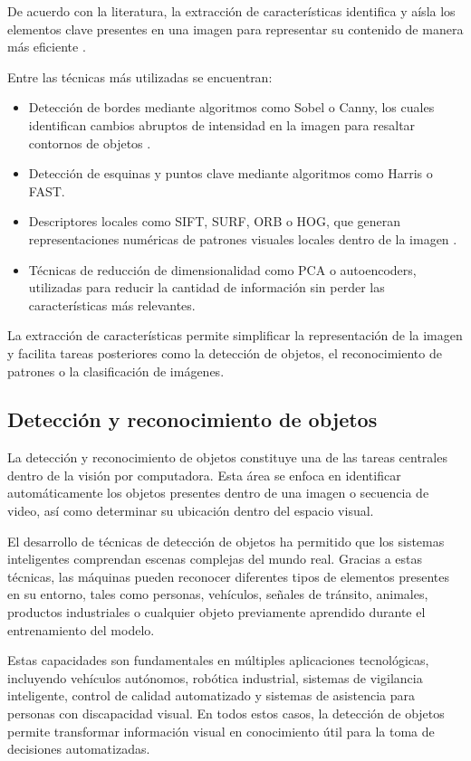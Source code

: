 De acuerdo con la literatura, la extracción de características identifica y aísla los elementos clave presentes en una imagen para representar su contenido de manera más eficiente \cite{unitxlabs_feature_extraction}.

Entre las técnicas más utilizadas se encuentran:
\begin{itemize}
    \item Detección de bordes mediante algoritmos como Sobel o Canny, los cuales identifican cambios abruptos de intensidad en la imagen para resaltar contornos de objetos \cite{unitxlabs_feature_extraction}.
    \item Detección de esquinas y puntos clave mediante algoritmos como Harris o FAST.
    \item Descriptores locales como SIFT, SURF, ORB o HOG, que generan representaciones numéricas de patrones visuales locales dentro de la imagen \cite{unitxlabs_feature_extraction}.
    \item Técnicas de reducción de dimensionalidad como PCA o autoencoders, utilizadas para reducir la cantidad de información sin perder las características más relevantes.
\end{itemize}

La extracción de características permite simplificar la representación de la imagen y facilita tareas posteriores como la detección de objetos, el reconocimiento de patrones o la clasificación de imágenes.

\subsection{Detección y reconocimiento de objetos}
La detección y reconocimiento de objetos constituye una de las tareas centrales dentro de la visión por computadora. Esta área se enfoca en identificar automáticamente los objetos presentes dentro de una imagen o secuencia de video, así como determinar su ubicación dentro del espacio visual.

El desarrollo de técnicas de detección de objetos ha permitido que los sistemas inteligentes comprendan escenas complejas del mundo real. Gracias a estas técnicas, las máquinas pueden reconocer diferentes tipos de elementos presentes en su entorno, tales como personas, vehículos, señales de tránsito, animales, productos industriales o cualquier objeto previamente aprendido durante el entrenamiento del modelo.

Estas capacidades son fundamentales en múltiples aplicaciones tecnológicas, incluyendo vehículos autónomos, robótica industrial, sistemas de vigilancia inteligente, control de calidad automatizado y sistemas de asistencia para personas con discapacidad visual. En todos estos casos, la detección de objetos permite transformar información visual en conocimiento útil para la toma de decisiones automatizadas.
